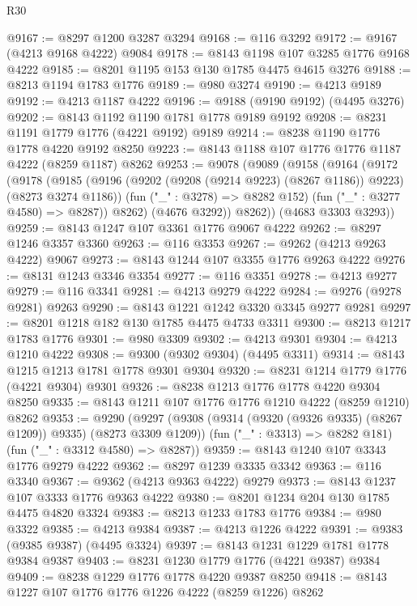 \begin{lexlean}{R30}
\begin{coremodule}
@9167 := @8297 @1200 @3287 @3294
@9168 := @116 @3292
@9172 := @9167 (@4213 @9168 @4222) @9084
@9178 := @8143 @1198 @107 @3285 @1776 @9168 @4222
@9185 := @8201 @1195 @153 @130 @1785 @4475 @4615 @3276
@9188 := @8213 @1194 @1783 @1776
@9189 := @980 @3274
@9190 := @4213 @9189
@9192 := @4213 @1187 @4222
@9196 := @9188 (@9190 @9192) (@4495 @3276)
@9202 := @8143 @1192 @1190 @1781 @1778 @9189 @9192
@9208 := @8231 @1191 @1779 @1776 (@4221 @9192) @9189
@9214 := @8238 @1190 @1776 @1778 @4220 @9192 @8250
@9223 := @8143 @1188 @107 @1776 @1776 @1187 @4222 (@8259 @1187) @8262
@9253 := @9078
    (@9089
      (@9158
        (@9164
          (@9172
            (@9178
              (@9185
                (@9196 (@9202 (@9208 (@9214 @9223) (@8267 @1186)) @9223) (@8273 @3274 @1186))
                (fun ("_" : @3278) => @8282 @152)
                (fun ("_" : @3277 @4580) => @8287))
              @8262)
            (@4676 @3292))
          @8262))
      (@4683 @3303 @3293))
@9259 := @8143 @1247 @107 @3361 @1776 @9067 @4222
@9262 := @8297 @1246 @3357 @3360
@9263 := @116 @3353
@9267 := @9262 (@4213 @9263 @4222) @9067
@9273 := @8143 @1244 @107 @3355 @1776 @9263 @4222
@9276 := @8131 @1243 @3346 @3354
@9277 := @116 @3351
@9278 := @4213 @9277
@9279 := @116 @3341
@9281 := @4213 @9279 @4222
@9284 := @9276 (@9278 @9281) @9263
@9290 := @8143 @1221 @1242 @3320 @3345 @9277 @9281
@9297 := @8201 @1218 @182 @130 @1785 @4475 @4733 @3311
@9300 := @8213 @1217 @1783 @1776
@9301 := @980 @3309
@9302 := @4213 @9301
@9304 := @4213 @1210 @4222
@9308 := @9300 (@9302 @9304) (@4495 @3311)
@9314 := @8143 @1215 @1213 @1781 @1778 @9301 @9304
@9320 := @8231 @1214 @1779 @1776 (@4221 @9304) @9301
@9326 := @8238 @1213 @1776 @1778 @4220 @9304 @8250
@9335 := @8143 @1211 @107 @1776 @1776 @1210 @4222 (@8259 @1210) @8262
@9353 := @9290
    (@9297
      (@9308 (@9314 (@9320 (@9326 @9335) (@8267 @1209)) @9335) (@8273 @3309 @1209))
      (fun ("_" : @3313) => @8282 @181)
      (fun ("_" : @3312 @4580) => @8287))
@9359 := @8143 @1240 @107 @3343 @1776 @9279 @4222
@9362 := @8297 @1239 @3335 @3342
@9363 := @116 @3340
@9367 := @9362 (@4213 @9363 @4222) @9279
@9373 := @8143 @1237 @107 @3333 @1776 @9363 @4222
@9380 := @8201 @1234 @204 @130 @1785 @4475 @4820 @3324
@9383 := @8213 @1233 @1783 @1776
@9384 := @980 @3322
@9385 := @4213 @9384
@9387 := @4213 @1226 @4222
@9391 := @9383 (@9385 @9387) (@4495 @3324)
@9397 := @8143 @1231 @1229 @1781 @1778 @9384 @9387
@9403 := @8231 @1230 @1779 @1776 (@4221 @9387) @9384
@9409 := @8238 @1229 @1776 @1778 @4220 @9387 @8250
@9418 := @8143 @1227 @107 @1776 @1776 @1226 @4222 (@8259 @1226) @8262

\end{coremodule}
\end{lexlean}
